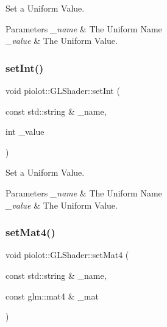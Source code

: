 Set a Uniform Value. 


\begin{DoxyParams}{Parameters}
{\em \+\_\+name} & The Uniform Name \\
\hline
{\em \+\_\+value} & The Uniform Value. \\
\hline
\end{DoxyParams}
\mbox{\label{classpiolot_1_1_g_l_shader_a5b8fd3a108bf576243a1e852872edf5c}} 
\subsubsection{\texorpdfstring{set\+Int()}{setInt()}}
{\footnotesize\ttfamily void piolot\+::\+G\+L\+Shader\+::set\+Int (\begin{DoxyParamCaption}\item[{const std\+::string \&}]{\+\_\+name,  }\item[{int}]{\+\_\+value }\end{DoxyParamCaption})\hspace{0.3cm}{\ttfamily [inline]}}



Set a Uniform Value. 


\begin{DoxyParams}{Parameters}
{\em \+\_\+name} & The Uniform Name \\
\hline
{\em \+\_\+value} & The Uniform Value. \\
\hline
\end{DoxyParams}
\mbox{\label{classpiolot_1_1_g_l_shader_a56d846ae1d7c6adc579c5de37db02546}} 
\subsubsection{\texorpdfstring{set\+Mat4()}{setMat4()}}
{\footnotesize\ttfamily void piolot\+::\+G\+L\+Shader\+::set\+Mat4 (\begin{DoxyParamCaption}\item[{const std\+::string \&}]{\+\_\+name,  }\item[{const glm\+::mat4 \&}]{\+\_\+mat }\end{DoxyParamCaption})\hspace{0.3cm}{\ttfamily [inline]}}



